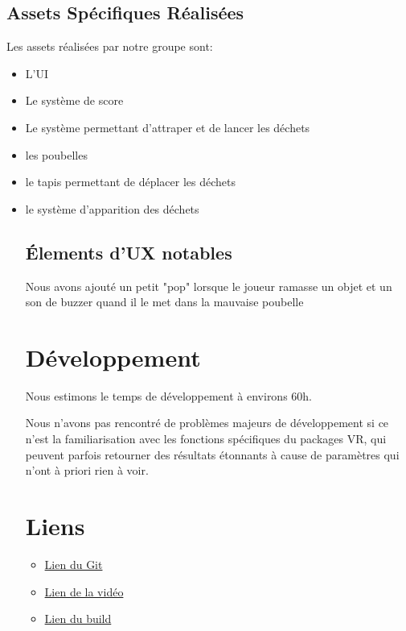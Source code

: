 \documentclass[a4paper,french,12pt]{article}
\begin{document}
\subsection{Assets Spécifiques Réalisées}

Les assets réalisées par notre groupe sont:
\begin{itemize}
\item L'UI
\item Le système de score
\item Le système permettant d'attraper et de lancer les déchets
\item les poubelles
\item le tapis permettant de déplacer les déchets
\item le système d'apparition des déchets

\subsection{Élements d'UX notables}

Nous avons ajouté un petit "pop" lorsque le joueur ramasse un objet et un son de buzzer quand il le met dans la mauvaise poubelle

\section{Développement}

Nous estimons le temps de développement à environs 60h.

Nous n'avons pas rencontré de problèmes majeurs de développement si ce n'est la familiarisation avec les fonctions spécifiques du packages VR, qui peuvent parfois retourner des résultats étonnants à cause de paramètres qui n'ont à priori rien à voir.

\section{Liens}
\begin{itemize}
\item \href{https://github.com/MartinFond/Projet_RV}{Lien du Git}

\item \href{https://drive.google.com/file/d/14MIBjIZLIeK-ba-3iSjfn7IGKH1ggph4/view?usp=share_link}{Lien de la vidéo}

\item \href{https://drive.google.com/file/d/1eOpNpBAcrODsFzoDIm0bHvClpjSXFn5u/view?usp=share_link}{Lien du build}
\end{itemize}

\end{itemize}
\end{document}
